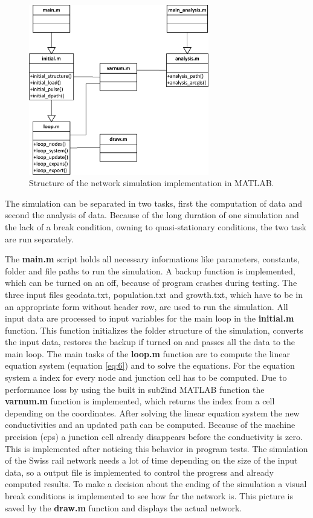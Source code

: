 \documentclass[11pt]{scrartcl}
\begin{document}
\begin{figure}[H]
	\centering
	\includegraphics[width=0.7\textwidth]{figures/source_code}
	\caption{Structure of the network simulation implementation in MATLAB.}
	\label{fig:structure}
\end{figure}

The simulation can be separated in two tasks, first the computation of data and second the analysis of data. Because of the long duration of one simulation and the lack of a break condition, owning to quasi-stationary conditions, the two task are run separately.

The \textbf{main.m} script holds all necessary informations like parameters, constants, folder and file paths to run the simulation. A backup function is implemented, which can be turned on an off, because of program crashes during testing. The three input files geodata.txt, population.txt and growth.txt, which have to be in an appropriate form without header row, are used to run the simulation. All input data are processed to input variables for the main loop in the \textbf{initial.m} function. This function initializes the folder structure of the simulation, converts the input data, restores the backup if turned on and passes all the data to the main loop. The main tasks of the \textbf{loop.m} function are to compute the linear equation system (equation \ref{eq:6}) and to solve the equations. For the equation system a index for every node and junction cell has to be computed. Due to performance loss by using the built in sub2ind MATLAB function the \textbf{varnum.m} function is implemented, which returns the index from a cell depending on the coordinates. After solving the linear equation system the new conductivities and an updated path can be computed. Because of the machine precision (eps) a junction cell already disappears before the conductivity is zero. This is implemented after noticing this behavior in program tests. The simulation of the Swiss rail network needs a lot of time depending on the size of the input data, so a output file is implemented to control the progress and already computed results. To make a decision about the ending of the simulation a visual break conditions is implemented to see how far the network is. This picture is saved by the \textbf{draw.m} function and displays the actual network.
\end{document}
